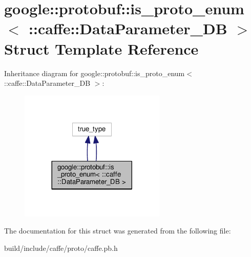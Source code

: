 \hypertarget{structgoogle_1_1protobuf_1_1is__proto__enum_3_01_1_1caffe_1_1_data_parameter___d_b_01_4}{}\section{google\+:\+:protobuf\+:\+:is\+\_\+proto\+\_\+enum$<$ \+:\+:caffe\+:\+:Data\+Parameter\+\_\+\+DB $>$ Struct Template Reference}
\label{structgoogle_1_1protobuf_1_1is__proto__enum_3_01_1_1caffe_1_1_data_parameter___d_b_01_4}


Inheritance diagram for google\+:\+:protobuf\+:\+:is\+\_\+proto\+\_\+enum$<$ \+:\+:caffe\+:\+:Data\+Parameter\+\_\+\+DB $>$\+:
\nopagebreak
\begin{figure}[H]
\begin{center}
\leavevmode
\includegraphics[width=197pt]{structgoogle_1_1protobuf_1_1is__proto__enum_3_01_1_1caffe_1_1_data_parameter___d_b_01_4__inherit__graph}
\end{center}
\end{figure}


The documentation for this struct was generated from the following file\+:\begin{DoxyCompactItemize}
\item 
build/include/caffe/proto/caffe.\+pb.\+h\end{DoxyCompactItemize}
